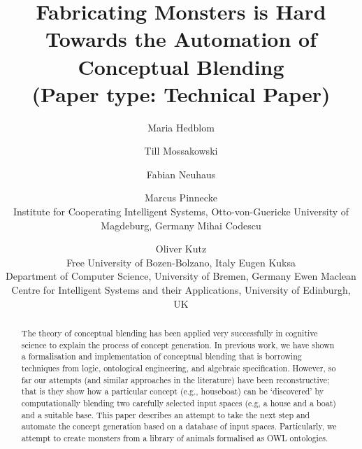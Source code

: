 \documentclass[letterpaper]{article}
\title{Fabricating Monsters is Hard\\ Towards the Automation of Conceptual Blending\\
(Paper type: Technical Paper)}
\author{
Maria Hedblom \and Till Mossakowski \and Fabian Neuhaus \and Marcus Pinnecke\\
Institute for Cooperating Intelligent Systems,  Otto-von-Guericke University of Magdeburg, Germany
\AND
Mihai Codescu \and Oliver Kutz \\
Free University of Bozen-Bolzano, Italy
\AND
Eugen Kuksa \\
Department of Computer Science, University of Bremen, Germany
\AND
Ewen Maclean\\
Centre for Intelligent Systems and their Applications, University of Edinburgh, UK}
\begin{document}
\maketitle



\begin{abstract}
The theory of conceptual blending has been applied very successfully  in cognitive
 science to explain the process of concept generation. In previous work, we have shown
  a formalisation and implementation of conceptual blending that is borrowing techniques 
  from logic, ontological engineering, and algebraic specification. However, so far 
  our attempts (and similar approaches in the literature) have been reconstructive;
   that is they show how a particular concept (e.g., houseboat)  can be `discovered' 
   by computationally blending two carefully selected input spaces (e.g, a house and a boat) 
   and a suitable base. This paper describes an attempt to take the next step and automate the
    concept generation based on a database of input spaces. Particularly, we attempt to create monsters from a library of animals formalised as OWL ontologies.
 

\end{abstract}
\end{document}
